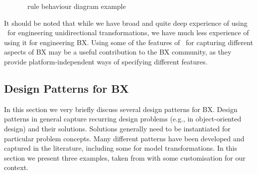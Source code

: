  \begin{figure}[htbp]
\caption{\transml\ rule behaviour diagram example}
\label{fig:transml-rule-behaviour-example}
\end{figure}

It should be noted that while we have broad and quite deep experience of using \transml\ for engineering unidirectional transformations, we have much less experience of using it for engineering BX. Using some of the features of \transml\ for capturing different aspects of BX may be a useful contribution to the BX community, as they provide platform-independent ways of specifying different features.

\subsection{Design Patterns for BX}
In this section we very briefly discuss several design patterns \cite{Gof1995} for BX. Design patterns in general capture recurring design problems (e.g., in object-oriented design) and their solutions. Solutions generally need to be instantiated for particular problem concepts. Many different patterns have been developed and captured in the literature, including some for model transformations. In this section we present three examples, taken from \cite{LanoKR14} with some customisation for our context.

